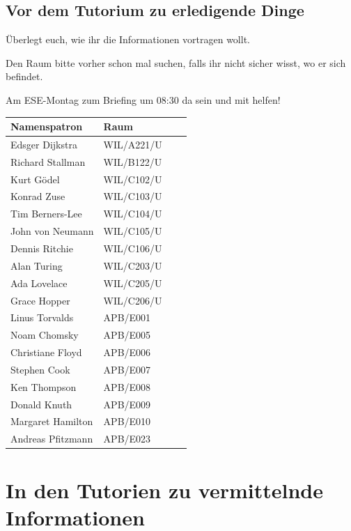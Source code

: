 \documentclass[a4paper,12pt]{report}
\begin{document}
\section{Vor dem Tutorium zu erledigende Dinge}
\begin{itemize*}
\item Überlegt euch, wie ihr die Informationen vortragen wollt.
\item Den Raum bitte vorher schon mal suchen, falls ihr nicht sicher wisst, wo er sich befindet.
\item Am ESE-Montag zum Briefing um 08:30 da sein und mit helfen!
\end{itemize*}

\label{tabelle}
\begin{center}
\vspace{1cm}
\begin{tabular}[h]{|l|l|l|l|}
	\hline
	\textbf{Namenspatron}		& \textbf{Raum}\\ \hline
	Edsger Dijkstra				& WIL/A221/U\\
	Richard Stallman			& WIL/B122/U\\
	Kurt Gödel					& WIL/C102/U\\
	Konrad Zuse					& WIL/C103/U\\
	Tim Berners-Lee				& WIL/C104/U\\
	John von Neumann			& WIL/C105/U\\
	Dennis Ritchie				& WIL/C106/U\\
	Alan Turing 				& WIL/C203/U\\
	Ada Lovelace				& WIL/C205/U\\
	Grace Hopper				& WIL/C206/U\\
	Linus Torvalds				& APB/E001\\
	Noam Chomsky				& APB/E005\\
	Christiane Floyd			& APB/E006\\
	Stephen Cook				& APB/E007\\
	Ken Thompson				& APB/E008\\
	Donald Knuth				& APB/E009\\
	Margaret Hamilton			& APB/E010\\
	Andreas Pfitzmann			& APB/E023\\
	\hline
\end{tabular}
\end{center}

\chapter{In den Tutorien zu vermittelnde Informationen}
\end{document}
